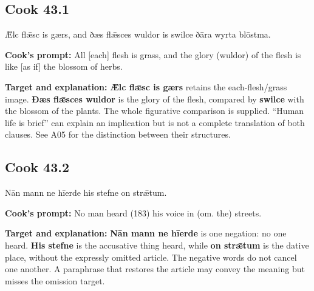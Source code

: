 \par\begin{minipage}{\linewidth}\raggedright
\subsection*{Cook 43.1}

Ǣlc flǣsc is gærs, and ðæs flǣsces wuldor is swilce ðāra wyrta blōstma.

\textbf{Cook's prompt:} All [each] flesh is grass, and the glory (wuldor) of the flesh is like [as if] the blossom of herbs.

\textbf{Target and explanation:} \textbf{Ǣlc flǣsc is gærs} retains the each-flesh/\allowbreak{}grass image. \textbf{Ðæs flǣsces wuldor} is the glory of the flesh, compared by \textbf{swilce} with the blossom of the plants. The whole figurative comparison is supplied. “Human life is brief” can explain an implication but is not a complete translation of both clauses. See A05 for the distinction between their structures.

\end{minipage}\par\addvspace{4pt}

\par\begin{minipage}{\linewidth}\raggedright
\subsection*{Cook 43.2}

Nān mann ne hīerde his stefne on strǣtum.

\textbf{Cook's prompt:} No man heard (183) his voice in (om. the) streets.

\textbf{Target and explanation:} \textbf{Nān mann ne hīerde} is one negation: no one heard. \textbf{His stefne} is the accusative thing heard, while \textbf{on strǣtum} is the dative place, without the expressly omitted article. The negative words do not cancel one another. A paraphrase that restores the article may convey the meaning but misses the omission target.

\end{minipage}\par\addvspace{4pt}

